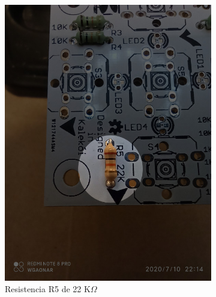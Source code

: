 \documentclass{article}
\begin{document}
\begin{figure}[H]
\begin{subfigure}[t]{0.3\textwidth}
        \includegraphics[width=0.9\columnwidth, height=1.2\columnwidth]{images/Botonera/botonera5.jpg}
        \caption{Resistencia R5 de 22 K$\Omega$}
        \label{fig:botonera_resistencias5}
    \end{subfigure}%
    \begin{subfigure}[t]{0.3\textwidth}
        \centering

\end{subfigure}
\end{figure}
\end{document}
